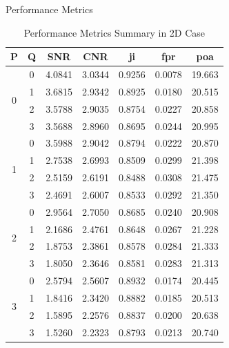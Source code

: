 \documentclass{beamer}
\begin{document}
\begin{frame}{Performance Metrics}
\begin{table}
\centering
\caption{Performance Metrics Summary in 2D Case}
\begin{tabular}{ccccccc}
\hline
\textbf{P} & \textbf{Q} & \textbf{SNR} & \textbf{CNR} & \gls{ji} & \gls{fpr} & \gls{poa} \\ \hline
\multirow{4}{*}{0} & 0 & 4.0841 & 3.0344 & 0.9256 & 0.0078 & 19.663 \\
 & 1 & 3.6815 & 2.9342 & 0.8925 & 0.0180 & 20.515 \\
 & 2 & 3.5788 & 2.9035 & 0.8754 & 0.0227 & 20.858 \\
 & 3 & 3.5688 & 2.8960 & 0.8695 & 0.0244 & 20.995 \\ \hline
\multirow{4}{*}{1} & 0 & 3.5988 & 2.9042 & 0.8794 & 0.0222 & 20.870 \\
 & 1 & 2.7538 & 2.6993 & 0.8509 & 0.0299 & 21.398 \\
 & 2 & 2.5159 & 2.6191 & 0.8488 & 0.0308 & 21.475 \\
 & 3 & 2.4691 & 2.6007 & 0.8533 & 0.0292 & 21.350 \\ \hline
\multirow{4}{*}{2} & 0 & 2.9564 & 2.7050 & 0.8685 & 0.0240 & 20.908 \\
 & 1 & 2.1686 & 2.4761 & 0.8648 & 0.0267 & 21.228 \\
 & 2 & 1.8753 & 2.3861 & 0.8578 & 0.0284 & 21.333 \\
 & 3 & 1.8050 & 2.3646 & 0.8581 & 0.0283 & 21.313 \\ \hline
\multirow{4}{*}{3} & 0 & 2.5794 & 2.5607 & 0.8932 & 0.0174 & 20.445 \\
 & 1 & 1.8416 & 2.3420 & 0.8882 & 0.0185 & 20.513 \\
 & 2 & 1.5895 & 2.2576 & 0.8837 & 0.0200 & 20.638 \\
 & 3 & 1.5260 & 2.2323 & 0.8793 & 0.0213 & 20.740 \\ \hline
\end{tabular}
\end{table}
\end{frame}
\end{document}

